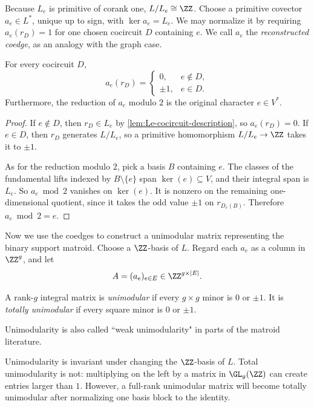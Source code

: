 \documentclass[11pt,letterpaper]{amsart}
\begin{document}
Because $L_e$ is primitive of corank one, $L/L_e\cong\ZZ$.  Choose a primitive covector $a_e\in L^*$, unique up to sign, with  $\ker a_e=L_e$. We may normalize it by requiring $a_e(r_D)=1$ for one chosen cocircuit $D$ containing $e$. We call $a_e$ the \emph{reconstructed coedge}, as an analogy with the graph case.

\begin{proposition}\label{prop:coedge-rule}
For every cocircuit $D$,
\begin{equation*}
  a_e(r_D)=
  \begin{cases}
    0,&e\notin D,\\
    \pm1,&e\in D.
  \end{cases}
\end{equation*}
Furthermore, the reduction of $a_e$ modulo $2$ is the original character $e\in V^*$.
\end{proposition}

\begin{proof}
If $e\notin D$, then $r_D\in L_e$ by \cref{lem:Le-cocircuit-description}, so $a_e(r_D)=0$.  If $e\in D$, then $r_D$ generates $L/L_e$, so a primitive homomorphism $L/L_e\to\ZZ$ takes it to $\pm1$.

As for the reduction modulo $2$, pick a basis $B$ containing $e$.  The classes of the fundamental lifts indexed by $B\setminus\{e\}$ span $\ker(e)\subseteq V$, and their integral span is $L_e$. So $a_e\bmod2$ vanishes on $\ker(e)$.  It is nonzero on the remaining one-dimensional quotient, since it takes the odd value $\pm1$ on $r_{D_e(B)}$. Therefore $a_e\bmod 2=e$.
\end{proof}

Now we use the coedges to construct a unimodular matrix representing the binary support matroid. Choose a $\ZZ$-basis of $L$.  Regard each $a_e$ as a column in $\ZZ^g$, and let
\[
  A=(a_e)_{e\in E}\in\ZZ^{g\times |E|}.
\]

\begin{definition}
A rank-$g$ integral matrix is \emph{unimodular} if every $g\times g$ minor is $0$ or $\pm1$.  It is \emph{totally unimodular} if every square minor is $0$ or $\pm1$.
\end{definition}

\begin{remark}
    Unimodularity is also called ``weak unimodularity" in parts of the matroid literature.
\end{remark}

Unimodularity is invariant under changing the $\ZZ$-basis of $L$. Total unimodularity is not: multiplying on the left by a matrix in $\GL_g(\ZZ)$ can create entries larger than $1$.  However, a full-rank unimodular matrix will become totally unimodular after normalizing one basis block to the identity.
\end{document}

